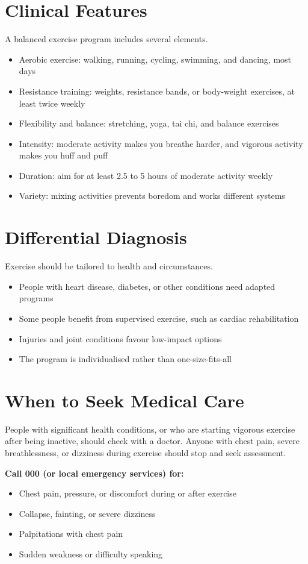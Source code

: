 \section*{Clinical Features}
A balanced exercise program includes several elements.
\begin{itemize}
    \item Aerobic exercise: walking, running, cycling, swimming, and dancing, most days
    \item Resistance training: weights, resistance bands, or body-weight exercises, at least twice weekly
    \item Flexibility and balance: stretching, yoga, tai chi, and balance exercises
    \item Intensity: moderate activity makes you breathe harder, and vigorous activity makes you huff and puff
    \item Duration: aim for at least 2.5 to 5 hours of moderate activity weekly
    \item Variety: mixing activities prevents boredom and works different systems
\end{itemize}

\section*{Differential Diagnosis}
Exercise should be tailored to health and circumstances.
\begin{itemize}
    \item People with heart disease, diabetes, or other conditions need adapted programs
    \item Some people benefit from supervised exercise, such as cardiac rehabilitation
    \item Injuries and joint conditions favour low-impact options
    \item The program is individualised rather than one-size-fits-all
\end{itemize}

\section*{When to Seek Medical Care}
People with significant health conditions, or who are starting vigorous exercise after being inactive, should check with a doctor. Anyone with chest pain, severe breathlessness, or dizziness during exercise should stop and seek assessment.

\textbf{Call 000 (or local emergency services) for:}
\begin{itemize}
    \item Chest pain, pressure, or discomfort during or after exercise
    \item Collapse, fainting, or severe dizziness
    \item Palpitations with chest pain
    \item Sudden weakness or difficulty speaking
\end{itemize}


